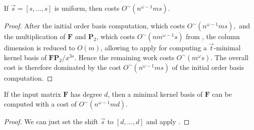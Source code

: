 \begin{thm}
\label{thm:costOfMinimalNullspaceBasisWithUniformShift}If $\vec{s}=\left[s,\dots,s\right]$
is uniform, then 
costs $O^{\sim}\left(n^{\omega-1}ms\right)$. \end{thm}
\begin{proof}
After the initial order basis computation, which costs $O^{\sim}\left(n^{\omega-1}ms\right),$
and the multiplication of $\mathbf{F}$ and $\mathbf{P}_{2}$, which
costs $O^{\sim}\left(nm^{\omega-1}s\right)$ from ,
the column dimension is reduced to $O\left(m\right)$, allowing 
to apply for computing a $\vec{t}$-minimal kernel basis of $\mathbf{F}\mathbf{P}_{2}/x^{3s}$.
Hence the remaining work costs $O^{\sim}\left(m^{\omega}s\right)$.
The overall cost is therefore dominated by the cost $O^{\sim}\left(n^{\omega-1}ms\right)$
of the initial order basis computation.\end{proof}
\begin{cor}
\label{cor:costOfMinimalNullspaceBasis}If the input matrix $\mathbf{F}$
has degree $d$, then a minimal kernel basis of $\mathbf{F}$ can
be computed with a cost of $O^{\sim}\left(n^{\omega-1}md\right)$. \end{cor}
\begin{proof}
We can just set the shift $\vec{s}$ to $\left[d,\dots,d\right]$
and apply . \end{proof}

